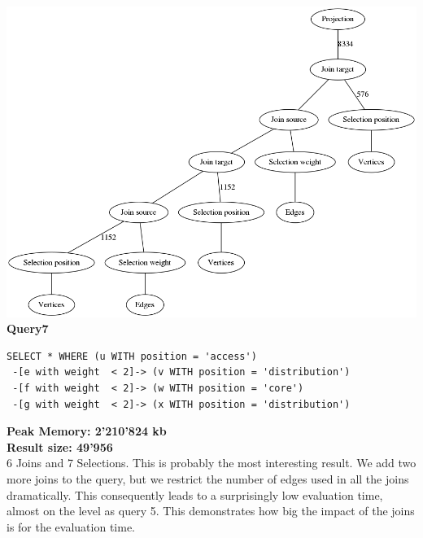\documentclass[11pt,singlecolumn]{scrartcl}
\begin{document}
\includegraphics[width=1\textwidth]{graph6}
\clearpage
\textbf{Query7}\\
\begin{verbatim}
SELECT * WHERE (u WITH position = 'access')
 -[e with weight  < 2]-> (v WITH position = 'distribution')
 -[f with weight  < 2]-> (w WITH position = 'core')
 -[g with weight  < 2]-> (x WITH position = 'distribution')\end{verbatim}
\textbf{Peak Memory: 2'210'824 kb}\\
\textbf{Result size: 49'956}\\
6 Joins and 7 Selections. This is probably the most interesting result. We add two more joins to the query, but we restrict the number of edges used in all the joins dramatically. This consequently leads to a surprisingly low evaluation time, almost on the level as query 5. This demonstrates how big the impact of the joins is for the evaluation time.
\clearpage
\end{document}
